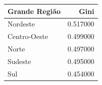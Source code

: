 \begin{tabular}{lr}
\toprule
Grande Região & Gini \\
\midrule
Nordeste & 0.517000 \\
Centro-Oeste & 0.499000 \\
Norte & 0.497000 \\
Sudeste & 0.495000 \\
Sul & 0.454000 \\
\bottomrule
\end{tabular}
